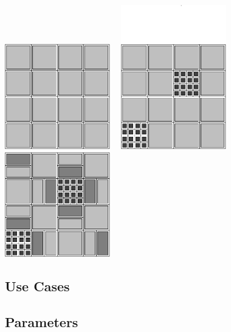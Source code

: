 \centerline{\includegraphics[width=1.8in]{amr4-1.eps} \ \
            \includegraphics[width=1.8in]{amr4-2.eps} \ \
            \includegraphics[width=1.8in]{amr4-3.eps}}


\subsection{Use Cases}
\subsection{Parameters}
